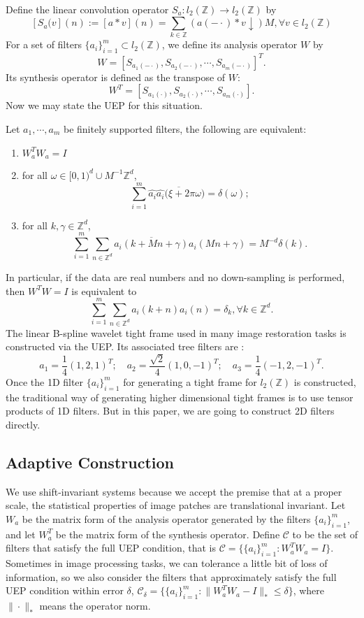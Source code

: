 \documentclass[a4paper]{article}
\begin{document}
Define the linear convolution operator $S_a: l_2(\mathbb{Z}) \rightarrow l_2(\mathbb{Z})$ by 
\[
[S_a(v](n):=[a*v](n)=\sum_{k\in\mathbb{Z}} (a(-\cdot)*v \downarrow)M, \forall v\in l_2(\mathbb{Z})
\]
For a set of filters $\{a_i\}_{i=1}^m\subset l_2(\mathbb{Z})$, we define its analysis operator $W$ by 
\[
	W=[S_{a_1(-\cdot)},S_{a_2(-\cdot)},\cdots,S_{a_m(-\cdot)}]^T.
\]
Its synthesis operator is defined as the transpose of $W$:
\[
	W^T=[S_{a_1(\cdot)},S_{a_2(\cdot)},\cdots, S_{a_m(\cdot )}].
\]
Now we may state the UEP for this situation.
\begin{prop}[cite]
Let $a_1,\cdots,a_m$ be finitely supported filters, the following are equivalent:
\begin{enumerate}
\item $W_a^T W_a = I$
\item for all $\omega \in [0,1)^d\cup M^{-1}\mathbb{Z}^d$,
	\[
		\sum_{i=1}^m \hat{a_i}\overline{\hat{a_i}(\xi + 2\pi\omega})=\delta(\omega);
	\]
\item for  all $k,\gamma \in \mathbb{Z}^d$,
	\[
		\sum_{i=1}^m \sum_{n\in\mathbb{Z}^d} \overline{a_i(k+Mn+\gamma)}a_i(Mn+\gamma)=M^{-d}\delta(k).
	\]
\end{enumerate}
\end{prop}
In particular, if the data are real numbers and no down-sampling is performed, then $W^TW=I$ is equivalent to 
\begin{equation}
\label{eq:uep}
	\sum_{i=1}^m \sum_{n\in \mathbb{Z}^d} a_i(k+n) a_i(n)=\delta_k, \forall k\in \mathbb{Z}^d.
\end{equation}
The linear B-spline wavelet tight frame used in many image restoration tasks is constructed via the UEP. Its associated tree filters are :
\[
	a_1=\frac{1}{4}(1,2,1)^T; \quad a_2=\frac{\sqrt{2}}{4}(1,0,-1)^T; \quad a_3=\frac{1}{4}(-1,2,-1)^T.
\]
Once the 1D filter $\{a_i\}_{i=1}^m$ for generating a tight frame for $l_2(\mathbb{Z})$ is constructed, the traditional way of generating higher dimensional tight frames is to use tensor products of 1D filters. But in this paper, we are going to construct 2D filters directly.

\subsection{Adaptive Construction}
We use shift-invariant systems because we accept the premise that at a proper scale, the statistical properties of image patches are translational invariant. Let $W_a$ be the matrix form of the analysis operator generated by the filters $\{a_i\}_{i=1}^m$, and let $W^T_a$ be the matrix form of the synthesis operator. Define $\mathcal{C}$ to be the set of filters that satisfy the full UEP condition, that is $\mathcal{C}=\{ \{a_i\}_{i=1}^m : W_a^TW_a=I\}$. Sometimes in image processing tasks, we can tolerance a little bit of loss of information, so we also consider the filters that approximately satisfy the full UEP condition within error $\delta$, $\mathcal{C}_\delta = \{\{a_i\}_{i=1}^m : \|W_a^TW_a -I\|_*\leq \delta\}$, where $\| \cdot \|_*$ means the operator norm.
\end{document}
